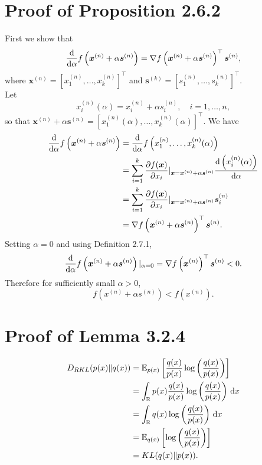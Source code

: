 \documentclass[honours,12pt, twoside]{unswthesis}
\newcommand{\R}{\mathbb{R}}
\numberwithin{equation}{section}
\theoremstyle{definition}
\begin{document}
\section{Proof of Proposition 2.6.2}\label{app:A.1}
First we show that
\[\frac{{\rm d}}{{\rm d}\alpha}f\left(\bm{x}^{(n)}+\alpha \bm{s}^{(n)}\right)=\nabla f\left(\bm{x}^{(n)}+\alpha \bm{s}^{(n)}\right)^\top \bm{s}^{(n)},\]
where $\bm{x}^{(n)}=\left[x_1^{(n)},\dots,x_k^{(n)}\right]^\top$ and $\bm{s}^{(k)}=\left[s_1^{(n)},\dots,s_k^{(n)}\right]^\top$.\\
Let
\[x_i^{(n)}(\alpha)=x_i^{(n)}+\alpha s_i^{(n)},\quad i=1,\dots,n,\]
so that $\bm{x}^{(n)}+\alpha \bm{s}^{(n)}=\left[x_1^{(n)}(\alpha),\dots,x_k^{(n)}(\alpha)\right]^\top$.
We have
\begin{align*}
\frac{{\rm d}}{{\rm d}\alpha}f\left(\bm{x}^{(n)}+\alpha\bm{s}^{(n)}\right)&= \frac{{\rm d}}{{\rm d}\alpha}f\left(x_1^{(n)},\dots,x_k^{(n)}(\alpha)\right)\\
&= \sum^k_{i=1}\frac{\partial f(\bm{x})}{\partial x_i}|_{\bm{x}=\bm{x}^{(n)}+\alpha \bm{s}^{(n)}}\frac{{\rm d}\left(x_i^{(n)}(\alpha)\right)}{{\rm d}\alpha}\\
&=\sum_{i=1}^k\frac{\partial f(\bm{x})}{\partial x_i}|_{\bm{x}=\bm{x}^{(n)}+\alpha \bm{s}^{(n)}}\bm{s}_i^{(n)}\\
&=\nabla f\left(\bm{x}^{(n)}+\alpha \bm{s}^{(n)}\right)^\top \bm{s}^{(n)}.
\end{align*}
Setting $\alpha=0$ and using Definition 2.7.1,
\[\frac{{\rm d}}{{\rm d}\alpha}f\left(\bm{x}^{(n)}+\alpha\bm{s}^{(n)}\right)|_{\alpha=0}=\nabla f\left(\bm{x}^{(n)}\right)^\top \bm{s}^{(n)}<0.\]
Therefore for sufficiently small $\alpha>0$,
\[f\left(x^{(n)}+\alpha s^{(n)}\right)<f\left(x^{(n)}\right).\]
\section{Proof of Lemma 3.2.4}\label{app:swag}
\begin{align*}
D_{RKL}(p(x)\|q(x))&=\mathbb{E}_{p(x)}\left[\frac{q(x)}{p(x)}\log \left(\frac{q(x)}{p(x)}\right)\right]\\
&=\int_\R p(x)\frac{q(x)}{p(x)}\log\left(\frac{q(x)}{p(x)}\right)\, {\rm d}x\\
&= \int_\R q(x)\log\left(\frac{q(x)}{p(x)}\right)\, {\rm d}x\\
&= \mathbb{E}_{q(x)}\left[\log \left(\frac{q(x)}{p(x)}\right)\right]\\
&=KL(q(x)\|p(x)).
\end{align*}
\end{document}
